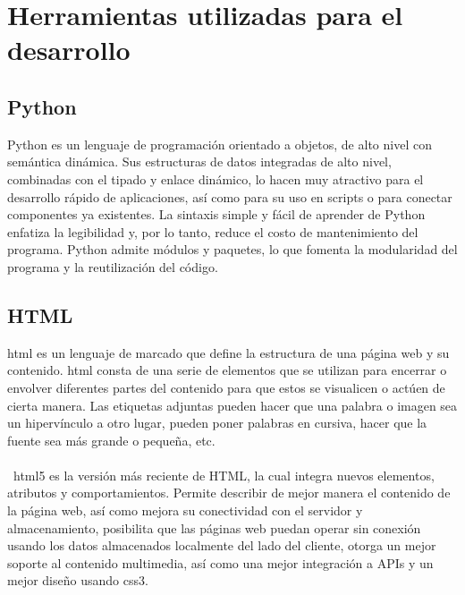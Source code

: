 \documentclass[12pt, a4paper, titlepage]{article}
\begin{document}
	\section{Herramientas utilizadas para el desarrollo}
	\subsection{Python}
	Python es un lenguaje de programación orientado a objetos, de alto nivel con semántica dinámica. Sus estructuras de datos integradas de alto nivel, combinadas con el tipado y enlace dinámico, lo hacen muy atractivo para el desarrollo rápido de aplicaciones, así como para su uso en scripts o para conectar componentes ya existentes. La sintaxis simple y fácil de aprender de Python enfatiza la legibilidad y, por lo tanto, reduce el costo de mantenimiento del programa. Python admite módulos y paquetes, lo que fomenta la modularidad del programa y la reutilización del código. \cite{refQuesPython}
	\subsection{HTML}
	\acrfull{html} es un lenguaje de marcado que define la estructura de una página web y su contenido. \acrshort{html} consta de una serie de elementos que se utilizan para encerrar o envolver diferentes partes del contenido para que estos se visualicen o actúen de cierta manera. Las etiquetas adjuntas pueden hacer que una palabra o imagen sea un hipervínculo a otro lugar, pueden poner palabras en cursiva, hacer que la fuente sea más grande o pequeña, etc. \cite{refHtml} \\\\\
	\acrshort{html}5 es la versión más reciente de HTML, la cual integra nuevos elementos, atributos y comportamientos. Permite describir de mejor manera el contenido de la página web, así como mejora su conectividad con el servidor y almacenamiento, posibilita que las páginas web puedan operar sin conexión usando los datos almacenados localmente del lado del cliente, otorga un mejor soporte al contenido multimedia, así como una mejor integración a APIs y un mejor diseño usando \acrshort{css}3.	\cite{refHtml2}
\end{document}
